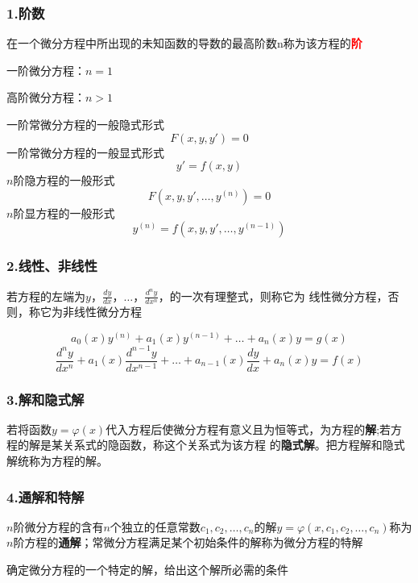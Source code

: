 \documentclass[oneside]{book} %
\begin{document}
\subsubsection{1.阶数}
\noindent {}在一个微分方程中所出现的未知函数的导数的最高阶数n称为该方程的\textbf{\textcolor{red}{阶}}

一阶微分方程：$n = 1$

高阶微分方程：$n > 1$

\noindent {}

\noindent 一阶常微分方程的一般隐式形式
$$ F(x,y,y') = 0$$
一阶常微分方程的一般显式形式
$$y' = f(x,y)$$
$n$阶隐方程的一般形式
$$ F(x,y,y',\dots,y^{(n)}) = 0$$
$n$阶显方程的一般形式
$$y^{(n)} = f(x,y,y',\dots,y^{(n-1)})$$


\subsubsection{2.线性、非线性}
\noindent {}若方程的左端为$y$，$\frac{dy}{dx}$，$\dots$，$\frac{d^n y}{d x^n} $，的一次有理整式，则称它为
线性微分方程，否则，称它为非线性微分方程

\noindent {}
$$a_{0}(x)y^{(n)} + a_{1}(x)y^{(n - 1)} + \dots + a_{n}(x)y = g(x)$$
$$\frac{d^n y}{d x^n} + a_{1}(x)\frac{d^{n-1} y}{d x^{n-1}} + \dots + a_{n -1}(x)\frac{dy}{dx} + a_{n}(x)y = f(x)  $$


\subsubsection{3.解和隐式解}
\noindent {}若将函数$y = \varphi(x)$代入方程后使微分方程有意义且为恒等式，为方程的\textbf{解};若方程的解是某关系式的隐函数，称这个关系式为该方程
的\textbf{隐式解}。把方程解和隐式解统称为方程的解。

\subsubsection{4.通解和特解}
\noindent {}$n$阶微分方程的含有$n$个独立的任意常数$c_{1},c_{2},\dots,c_{n}$的解$y = \varphi(x,c_{1},c_{2},\dots,c_{n})$称为$n$阶方程的\textbf{通解}；常微分方程满足某个初始条件的解称为微分方程的特解

\noindent {}确定微分方程的一个特定的解，给出这个解所必需的条件
\end{document}
